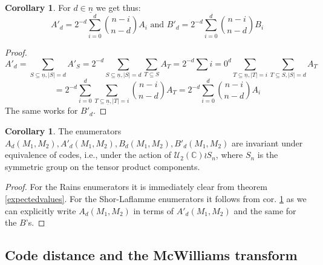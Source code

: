 \documentclass{article}
\def\C{\mathbb{C}}
\def\U{\mathcal{U}}
\def\n{\underline{n}}
\newenvironment{bew}{\begin{proof}[Proof]}{\end{proof}}
\theoremstyle{definition}
\newtheorem{cor}[Satz]{Corollary}
\begin{document}
\begin{cor}\label{corlincomb}
For $d \in \n$ we get thus: \begin{equation} A'_d = 2^{-d} \sum_{i=0}^d \binom{n-i}{n-d} A_i \text{  and   } B'_d = 2^{-d} \sum_{i=0}^d \binom{n-i}{n-d} B_i \end{equation}
\begin{bew}
\begin{equation}  A'_d = \sum_{S \subseteq \n, |S| = d} A'_S = 2^{-d} \sum_{S \subseteq \n, |S| = d} \sum_{T \subseteq S} A_T  = 2^{-d} \sum{i=0}^d \sum_{T \subseteq \n, |T| = i} \sum_{T \subseteq S, |S| = d} A_T \end{equation}
 \begin{equation} = 2^{-d} \sum_{i=0}^d \sum_{T \subseteq \n, |T| = i} \binom{n-i}{n-d}A_T = 2^{-d} \sum_{i=0}^d \binom{n-i}{n-d} A_i \end{equation}
The same works for $B'_d$.
\end{bew}
\end{cor}

\begin{cor}
The enumerators $A_d(M_1,M_2), A'_d(M_1,M_2), B_d(M_1,M_2), B'_d(M_1,M_2)$ are invariant under equivalence of codes, i.e., under the action of $ \U_2(\C) \wr S_n$, where $S_n$ is the symmetric group on the tensor product components.
\begin{bew}
For the Rains enumerators it is immediately clear from theorem \ref{expectedvalues}. For the Shor-Laflamme enumerators it follows from cor. \ref{corlincomb}  as we can explicitly write $A_d(M_1,M_2)$ in terms of $A'_d(M_1,M_2)$ and the same for the $B$'s.
\end{bew}
\end{cor}

\subsection{Code distance and the McWilliams transform}
\end{document}
